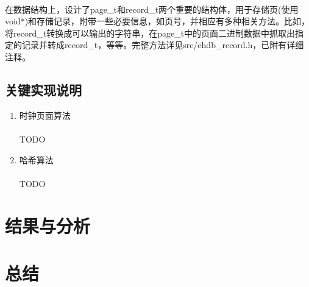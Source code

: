 \documentclass{article}
\begin{document}
        \paragraph{}
            在数据结构上，设计了page\_t和record\_t两个重要的结构体，用于存储页(使用void*)和存储记录，附带一些必要信息，如页号，并相应有多种相关方法。比如，将record\_t转换成可以输出的字符串，在page\_t中的页面二进制数据中抓取出指定的记录并转成record\_t，等等。完整方法详见src/ehdb\_record.h，已附有详细注释。
    \subsection{关键实现说明}
        \begin{enumerate}
            \item 时钟页面算法
                \paragraph{}
                    TODO
            \item 哈希算法
                \paragraph{}
                    TODO
        \end{enumerate}
\section{结果与分析}
\section{总结}
\end{document}
